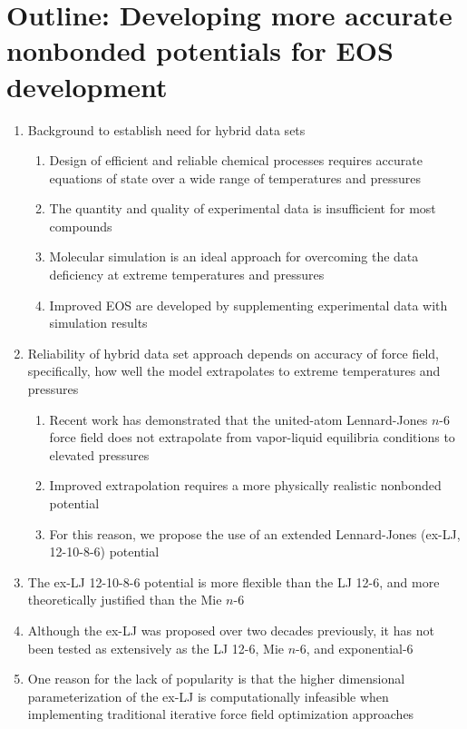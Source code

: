 \documentclass[11pt,a4paper]{article}
\begin{document}
\section{Outline: Developing more accurate nonbonded potentials for EOS development}

\begin{enumerate}
	\item Background to establish need for hybrid data sets
	\begin{enumerate}
		\item Design of efficient and reliable chemical processes requires accurate equations of state over a wide range of temperatures and pressures
		\item The quantity and quality of experimental data is insufficient for most compounds
		\item Molecular simulation is an ideal approach for overcoming the data deficiency at extreme temperatures and pressures
		\item Improved EOS are developed by supplementing experimental data with simulation results
	\end{enumerate}
	\item Reliability of hybrid data set approach depends on accuracy of force field, specifically, how well the model extrapolates to extreme temperatures and pressures
	\begin{enumerate}
		\item Recent work has demonstrated that the united-atom Lennard-Jones $n$-6 force field does not extrapolate from vapor-liquid equilibria conditions to elevated pressures
		\item Improved extrapolation requires a more physically realistic nonbonded potential
		\item For this reason, we propose the use of an extended Lennard-Jones (ex-LJ, 12-10-8-6) potential
	\end{enumerate}
	\item The ex-LJ 12-10-8-6 potential is more flexible than the LJ 12-6, and more theoretically justified than the Mie $n$-6
	\item Although the ex-LJ was proposed over two decades previously, it has not been tested as extensively as the LJ 12-6, Mie $n$-6, and exponential-6
	\item One reason for the lack of popularity is that the higher dimensional parameterization of the ex-LJ is computationally infeasible when implementing traditional iterative force field optimization approaches
	\begin{enumerate}

\end{enumerate}
\end{enumerate}
\end{document}
